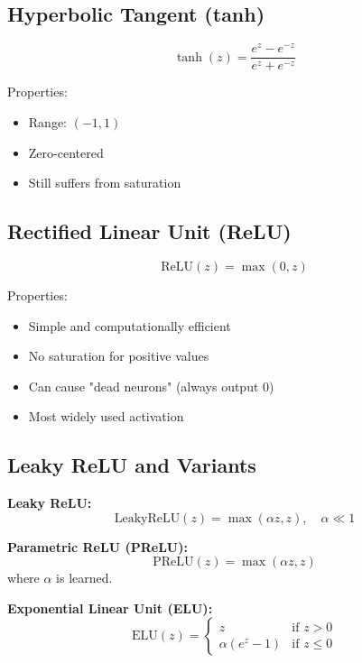 \subsection{Hyperbolic Tangent (tanh)}

\begin{equation}
\tanh(z) = \frac{e^z - e^{-z}}{e^z + e^{-z}}
\end{equation}

Properties:
\begin{itemize}
    \item Range: $(-1, 1)$
    \item Zero-centered
    \item Still suffers from saturation
\end{itemize}

\subsection{Rectified Linear Unit (ReLU)}

\begin{equation}
\text{ReLU}(z) = \max(0, z)
\end{equation}

Properties:
\begin{itemize}
    \item Simple and computationally efficient
    \item No saturation for positive values
    \item Can cause "dead neurons" (always output 0)
    \item Most widely used activation
\end{itemize}

\subsection{Leaky ReLU and Variants}

\textbf{Leaky ReLU:}
\begin{equation}
\text{LeakyReLU}(z) = \max(\alpha z, z), \quad \alpha \ll 1
\end{equation}

\textbf{Parametric ReLU (PReLU):}
\begin{equation}
\text{PReLU}(z) = \max(\alpha z, z)
\end{equation}
where $\alpha$ is learned.

\textbf{Exponential Linear Unit (ELU):}
\begin{equation}
\text{ELU}(z) = \begin{cases}
z & \text{if } z > 0 \\
\alpha(e^z - 1) & \text{if } z \leq 0
\end{cases}
\end{equation}

